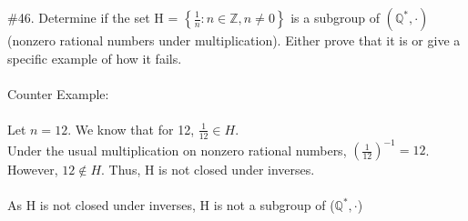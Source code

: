 \documentclass[11pt]{amsart}
\begin{document}
\vskip 0.2in


\#46. Determine if the set H = $\left\{{\frac{1}{n} : n \in \mathbb{Z}, n\neq 0}\right\}$ is a subgroup of $(\mathbb{Q}^{\ast}, \cdot)$ (nonzero rational numbers under multiplication). Either prove that it is or give a specific example of how it fails.\\
\\Counter Example:
\\
\\Let $n=12$. We know that for 12, $\frac{1}{12}\in H$. 
\\Under the usual multiplication on nonzero rational numbers, $(\frac{1}{12})^{-1}=12$. However, $12\notin H$. Thus, H is not closed under inverses.
\\
\\As H is not closed under inverses, H is not a subgroup of ($\mathbb{Q^*},\cdot$) 
\\
\vskip 0.2in
\end{document}
